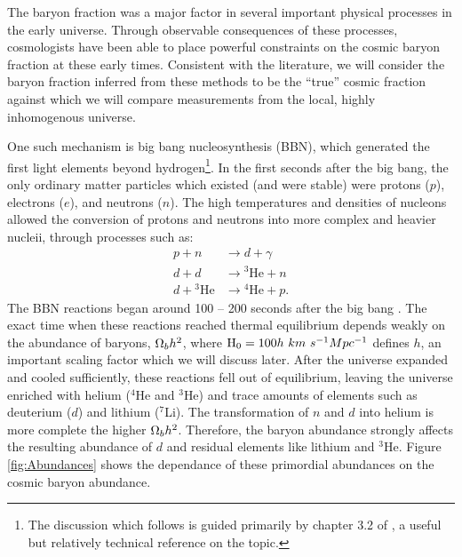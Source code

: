 The baryon fraction was a major factor in several important physical
processes in the early universe. Through observable consequences of
these processes, cosmologists have been able to place powerful
constraints on the cosmic baryon fraction at these early
times. Consistent with the literature, we will consider the baryon
fraction inferred from these methods to be the ``true'' cosmic
fraction against which we will compare measurements from the local,
highly inhomogenous universe.

One such mechanism is big bang nucleosynthesis (BBN), which generated
the first light elements beyond hydrogen\footnote{The discussion which
  follows is guided primarily by chapter 3.2 of \citet{Weinberg2008},
  a useful but relatively technical reference on the topic.}. In the
first seconds after the big bang, the only ordinary matter particles
which existed (and were stable) were protons ($p$), electrons
($e$), and neutrons ($n$). The high temperatures and densities of
nucleons allowed the conversion of protons and neutrons into more
complex and heavier nucleii, through processes such as:
\begin{align}
p + n &\rightarrow{} d + \gamma \nonumber \\
d + d &\rightarrow{} ^3\textrm{He} + n \nonumber \\
d +{} ^3\textrm{He} &\rightarrow{} ^4\textrm{He} + p .\nonumber
\end{align}
The BBN reactions began around 100 -- 200 seconds after the big bang
\citep{Weinberg2008}. The exact time when these reactions reached
thermal equilibrium depends weakly on the abundance of baryons,
$\Omega_b h^2$, where $\textrm{H\ensuremath{_0}} = 100h~km~s^{-1} Mpc^{-1}$ defines $h$, an
important scaling factor which we will discuss later. After the
universe expanded and cooled sufficiently, these reactions fell out of
equilibrium, leaving the universe enriched with helium ($^4$He and
$^3$He) and trace amounts of elements such as deuterium ($d$) and
lithium ($^7$Li). The transformation of $n$ and $d$ into helium is
more complete the higher $\Omega_b h^2$. Therefore, the baryon
abundance strongly affects the resulting abundance of $d$ and residual
elements like lithium and $^3$He. Figure \ref{fig:Abundances} shows
the dependance of these primordial abundances on the cosmic baryon
abundance.



